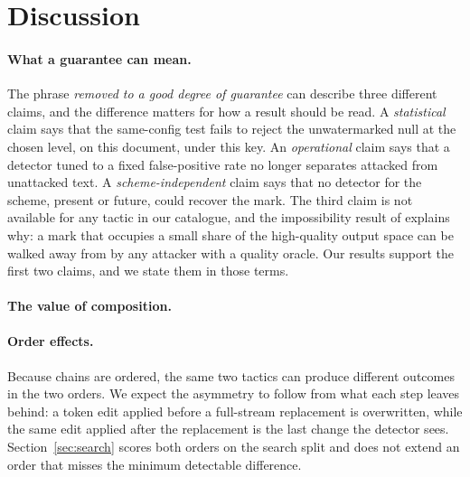 \section{Discussion}
\label{sec:discussion}

\paragraph{What a guarantee can mean.}
The phrase \emph{removed to a good degree of guarantee} can describe three different claims, and the difference matters for how a result should be read. A \emph{statistical} claim says that the same-config test fails to reject the unwatermarked null at the chosen level, on this document, under this key. An \emph{operational} claim says that a detector tuned to a fixed false-positive rate no longer separates attacked from unattacked text. A \emph{scheme-independent} claim says that no detector for the scheme, present or future, could recover the mark. The third claim is not available for any tactic in our catalogue, and the impossibility result of \citet{sand} explains why: a mark that occupies a small share of the high-quality output space can be walked away from by any attacker with a quality oracle. Our results support the first two claims, and we state them in those terms.

\paragraph{The value of composition.}

\paragraph{Order effects.}
Because chains are ordered, the same two tactics can produce different outcomes in the two orders. We expect the asymmetry to follow from what each step leaves behind: a token edit applied before a full-stream replacement is overwritten, while the same edit applied after the replacement is the last change the detector sees. Section~\ref{sec:search} scores both orders on the search split and does not extend an order that misses the minimum detectable difference. 

